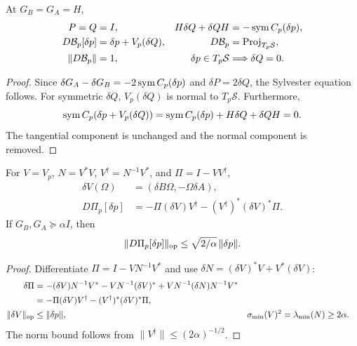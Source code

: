 \begin{corollary}
At $G_B=G_A=H$,
\begin{align}
P=Q&=I,&
H\delta Q+\delta QH&=-\operatorname{sym} C_p(\delta p),\\
D\mathcal B_p[\delta p]&=\delta p+V_p(\delta Q),&
D\mathcal B_p&=\operatorname{Proj}_{T_p\mathcal S},\\
\|D\mathcal B_p\|&=1,&
\delta p\in T_p\mathcal S&\Longrightarrow\delta Q=0 .
\end{align}
\end{corollary}
\begin{proof}
Since $\delta G_A-\delta G_B=-2\operatorname{sym} C_p(\delta p)$ and
$\delta P=2\delta Q$, the Sylvester equation follows.
For symmetric $\delta Q$, $V_p(\delta Q)$ is normal to
$T_p\mathcal S$. Furthermore,
\begin{equation}
\operatorname{sym} C_p(\delta p+V_p(\delta Q))
=\operatorname{sym} C_p(\delta p)+H\delta Q+\delta QH=0 .
\end{equation}
The tangential component is unchanged and the normal component is
removed.
\end{proof}

\begin{lemma}
For $V=V_p$, $N=V^*V$, $V^\dagger=N^{-1}V^*$, and
$\Pi=I-VV^\dagger$,
\begin{align}
\delta V(\Omega)&=(\delta B\Omega,-\Omega\delta A),\\
D\Pi_p[\delta p]
&=-\Pi(\delta V)V^\dagger-(V^\dagger)^*(\delta V)^*\Pi .
\label{eq:rigid-projector-state-derivative}
\end{align}
If $G_B,G_A\succeq\alpha I$, then
\begin{equation}
\|D\Pi_p[\delta p]\|_{\rm op}
\leq\sqrt{2/\alpha}\,\|\delta p\| .
\end{equation}
\end{lemma}
\begin{proof}
Differentiate $\Pi=I-VN^{-1}V^*$ and use
$\delta N=(\delta V)^*V+V^*(\delta V)$:
\begin{align}
\delta\Pi
&=-(\delta V)N^{-1}V^*-VN^{-1}(\delta V)^*
+VN^{-1}(\delta N)N^{-1}V^*\\
&=-\Pi(\delta V)V^\dagger-(V^\dagger)^*(\delta V)^*\Pi,\\
\|\delta V\|_{\rm op}&\leq\|\delta p\|,&
\sigma_{\min}(V)^2&=\lambda_{\min}(N)\geq2\alpha .
\end{align}
The norm bound follows from $\|V^\dagger\|\leq(2\alpha)^{-1/2}$.
\end{proof}


